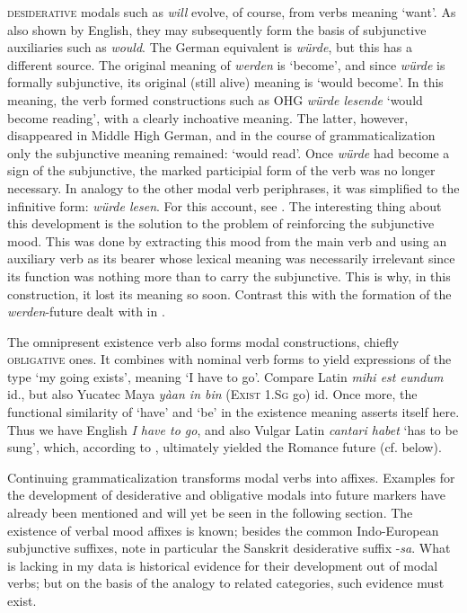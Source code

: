 \textsc{desiderative} modals such as \textit{will} evolve, of course, from verbs meaning ‘want’. As also shown by English, they may subsequently form the basis of subjunctive auxiliaries such as \textit{would}. The German equivalent is \textit{würde}, but this has a different source. The original meaning of \textit{werden} is ‘become’, and since \textit{würde} is formally subjunctive, its original (still alive) meaning is ‘would become’. In this meaning, the verb formed constructions such as OHG \textit{würde lesende} ‘would become reading’, with a clearly inchoative meaning. The latter, however, disappeared in Middle High German, and in the course of grammaticalization only the subjunctive meaning remained: ‘would read’. Once \textit{würde} had become a sign of the subjunctive, the marked participial form of the verb was no longer necessary. In analogy to the other modal verb periphrases, it was simplified to the infinitive form: \textit{würde lesen}. For this account, see \citet[60f]{Ronneberger-Sibold1980}. The interesting thing about this development is the solution to the problem of reinforcing the subjunctive mood. This was done by extracting this mood from the main verb and using an auxiliary verb as its bearer whose lexical meaning was necessarily irrelevant since its function was nothing more than to carry the subjunctive. This is why, in this construction, it lost its meaning so soon. Contrast this with the formation of the \textit{werden}{}-future dealt with in .

The omnipresent existence verb also forms modal constructions, chiefly \textsc{obli\-gative} ones. It combines with nominal verb forms to yield expressions of the type ‘my going exists’, meaning ‘I have to go’. Compare Latin \textit{mihi est eundum} id., but also Yucatec Maya \textit{yàan in bin} (\textsc{Exist} 1.\textsc{Sg} go) id. Once more, the functional similarity of ‘have’ and ‘be’ in the existence meaning asserts itself here. Thus we have English \textit{I have to go}, and also Vulgar Latin \textit{cantari habet} ‘has to be sung’, which, according to \citet[§\textsc{ii}]{Benveniste1968}, ultimately yielded the Romance future (cf. below).

Continuing grammaticalization transforms modal verbs into affixes. Examples for the development of desiderative and obligative modals into future markers have already been mentioned and will yet be seen in the following section. The existence of verbal mood affixes is known; besides the common Indo-European subjunctive suffixes, note in particular the Sanskrit desiderative suffix -\textit{sa}. What is lacking in my data is historical evidence for their development out of modal verbs; but on the basis of the analogy to related categories, such evidence must exist.

